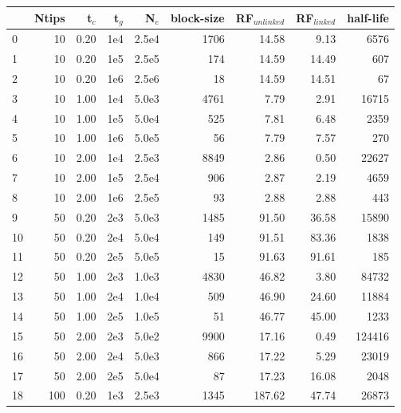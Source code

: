 \documentclass[11pt]{article}
\begin{document}
\begin{table}
\begin{center}
\begin{tabular}{lrrrrrrrr}
\toprule
{} &  Ntips &  t$_c$ &  t$_g$ &   N$_e$  &  block-size  & RF$_{unlinked}$ & RF$_{linked}$ &  half-life\\
\midrule
0  &     10 &  0.20 &   1e4 &  2.5e4 &  1706  &     14.58 &     9.13  &  6576   \\
1  &     10 &  0.20 &   1e5 &  2.5e5 &   174  &     14.59 &    14.49  &  607  \\
2  &     10 &  0.20 &   1e6 &  2.5e6 &    18  &     14.59 &    14.51  &  67  \\
3  &     10 &  1.00 &   1e4 &  5.0e3 &  4761  &      7.79 &     2.91  &  16715  \\
4  &     10 &  1.00 &   1e5 &  5.0e4 &   525  &      7.81 &     6.48  &  2359  \\
5  &     10 &  1.00 &   1e6 &  5.0e5 &    56  &      7.79 &     7.57  &  270  \\
6  &     10 &  2.00 &   1e4 &  2.5e3 &  8849  &      2.86 &     0.50  &  22627  \\
7  &     10 &  2.00 &   1e5 &  2.5e4 &   906  &      2.87 &     2.19  &  4659  \\
8  &     10 &  2.00 &   1e6 &  2.5e5 &    93  &      2.88 &     2.88  &  443  \\
\hline
9  &     50 &  0.20 &   2e3 &  5.0e3 &   1485 &    91.50 &    36.58   &  15890  \\
10 &     50 &  0.20 &   2e4 &  5.0e4 &    149 &    91.51 &    83.36   &  1838  \\
11 &     50 &  0.20 &   2e5 &  5.0e5 &     15 &    91.63 &    91.61   &  185  \\
12 &     50 &  1.00 &   2e3 &  1.0e3 &   4830 &    46.82 &     3.80   &  84732  \\
13 &     50 &  1.00 &   2e4 &  1.0e4 &    509 &    46.90 &    24.60   &  11884  \\
14 &     50 &  1.00 &   2e5 &  1.0e5 &     51 &    46.77 &    45.00   &  1233  \\
15 &     50 &  2.00 &   2e3 &  5.0e2 &   9900 &    17.16 &     0.49   &  124416  \\
16 &     50 &  2.00 &   2e4 &  5.0e3 &    866 &    17.22 &     5.29   &  23019  \\
17 &     50 &  2.00 &   2e5 &  5.0e4 &     87 &    17.23 &    16.08   &  2048  \\
\hline
18 &    100 &  0.20 &   1e3 &  2.5e3 &   1345 &     187.62 &    47.74  &  26873   \\

\end{tabular}
\end{center}
\end{table}
\end{document}
